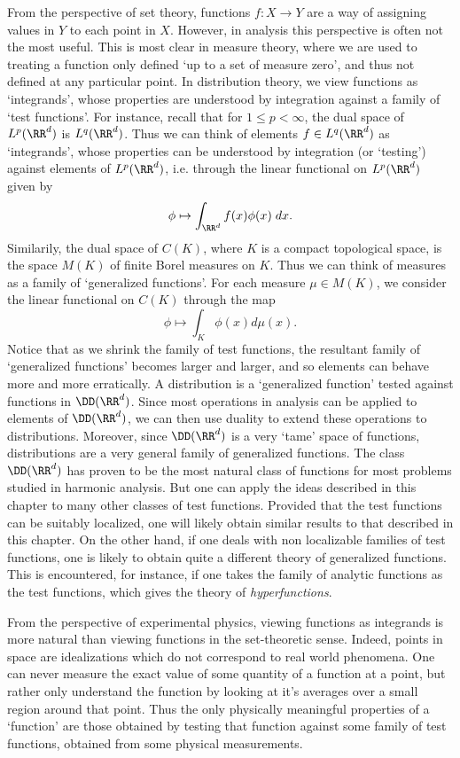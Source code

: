 From the perspective of set theory, functions $f: X \to Y$ are a way of assigning values in $Y$ to each point in $X$. However, in analysis this perspective is often not the most useful. This is most clear in measure theory, where we are used to treating a function only defined `up to a set of measure zero', and thus not defined at any particular point. In distribution theory, we view functions as `integrands', whose properties are understood by integration against a family of `test functions'. For instance, recall that for $1 \leq p < \infty$, the dual space of $L^p(\RR^d)$ is $L^q(\RR^d)$. Thus we can think of elements $f \in L^q(\RR^d)$ as `integrands', whose properties can be understood by integration (or `testing') against elements of $L^p(\RR^d)$, i.e. through the linear functional on $L^p(\RR^d)$ given by
%
\[ \phi \mapsto \int_{\RR^d} f(x) \phi(x)\; dx. \]
%
Similarily, the dual space of $C(K)$, where $K$ is a compact topological space, is the space $M(K)$ of finite Borel measures on $K$. Thus we can think of measures as a family of `generalized functions'. For each measure $\mu \in M(K)$, we consider the linear functional on $C(K)$ through the map
%
\[ \phi \mapsto \int_K \phi(x) d\mu(x). \]
%
Notice that as we shrink the family of test functions, the resultant family of `generalized functions' becomes larger and larger, and so elements can behave more and more erratically. A distribution is a `generalized function' tested against functions in $\DD(\RR^d)$. Since most operations in analysis can be applied to elements of $\DD(\RR^d)$, we can then use duality to extend these operations to distributions. Moreover, since $\DD(\RR^d)$ is a very `tame' space of functions, distributions are a very general family of generalized functions. The class $\DD(\RR^d)$ has proven to be the most natural class of functions for most problems studied in harmonic analysis. But one can apply the ideas described in this chapter to many other classes of test functions. Provided that the test functions can be suitably localized, one will likely obtain similar results to that described in this chapter. On the other hand, if one deals with non localizable families of test functions, one is likely to obtain quite a different theory of generalized functions. This is encountered, for instance, if one takes the family of analytic functions as the test functions, which gives the theory of \emph{hyperfunctions}.

\begin{remark}
  From the perspective of experimental physics, viewing functions as integrands is more natural than viewing functions in the set-theoretic sense. Indeed, points in space are idealizations which do not correspond to real world phenomena. One can never measure the exact value of some quantity of a function at a point, but rather only understand the function by looking at it's averages over a small region around that point. Thus the only physically meaningful properties of a `function' are those obtained by testing that function against some family of test functions, obtained from some physical measurements.
\end{remark}

